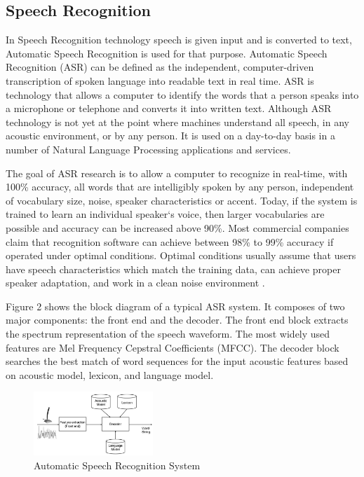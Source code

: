 \documentclass[conference]{IEEEtran}
\begin{document}
\subsection{\textbf{Speech Recognition}}
In Speech Recognition technology speech is given input and is converted to text, Automatic Speech Recognition is used for that purpose. Automatic Speech Recognition (ASR) can be defined as the independent, computer-driven transcription of spoken language into readable text in real time. ASR is technology that allows a computer to identify the words that a person speaks into a microphone or telephone and converts it into written text. Although ASR technology is not yet at the point where machines understand all speech, in any acoustic environment, or by any person. It is used on a day-to-day basis in a number of Natural Language Processing applications and services. 

The goal of ASR research is to allow a computer to recognize in real-time, with 100\% accuracy, all words that are intelligibly spoken by any person, independent of vocabulary size, noise, speaker characteristics or accent. Today, if the system is trained to learn an individual speaker‘s voice, then larger vocabularies are possible and accuracy can be increased above 90\%. Most commercial companies claim that recognition software can achieve between 98\% to 99\% accuracy if operated under optimal conditions. Optimal conditions usually assume that users have speech characteristics which match the training data, can achieve proper speaker adaptation, and work in a clean noise environment \cite{b1}. 

Figure 2 shows the block diagram of a typical ASR system. It composes of two major components: the front end and the decoder. The front end block extracts the spectrum representation of the speech waveform. The most widely used features are Mel Frequency Cepstral Coefficients (MFCC)\cite{b2}. The decoder block searches the best match of word sequences for the input acoustic features based on acoustic model, lexicon, and language model. 
\begin{figure}[!ht]
	\centering
	\includegraphics[width=0.4\textwidth]{ASR.png}
	\caption{Automatic Speech Recognition System\cite{b3}}
\end{figure}\\
\end{document}
